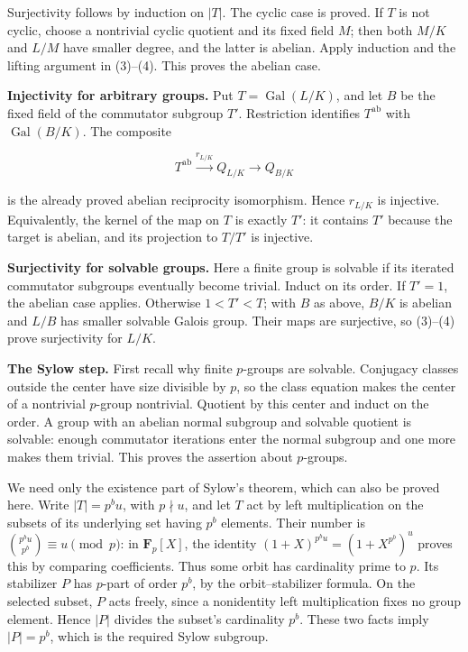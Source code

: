 \documentclass[11pt,a4paper]{article}
\begin{document}
Surjectivity follows by induction on \(|T|\). The cyclic case is proved.
If \(T\) is not cyclic, choose a nontrivial cyclic quotient and its
fixed field \(M\); then both \(M/K\) and \(L/M\) have smaller degree,
and the latter is abelian. Apply induction and the lifting argument in
(3)--(4). This proves the abelian case.

\textbf{Injectivity for arbitrary groups.} Put
\(T=\operatorname{Gal}(L/K)\), and let \(B\) be the fixed field of the
commutator subgroup \(T'\). Restriction identifies \(T^{\mathrm{ab}}\)
with \(\operatorname{Gal}(B/K)\). The composite

\[
T^{\mathrm{ab}}\xrightarrow{r_{L/K}}Q_{L/K}
\longrightarrow Q_{B/K}
\]

is the already proved abelian reciprocity isomorphism. Hence \(r_{L/K}\)
is injective. Equivalently, the kernel of the map on \(T\) is exactly
\(T'\): it contains \(T'\) because the target is abelian, and its
projection to \(T/T'\) is injective.

\textbf{Surjectivity for solvable groups.} Here a finite group is
solvable if its iterated commutator subgroups eventually become trivial.
Induct on its order. If \(T'=1\), the abelian case applies. Otherwise
\(1<T'<T\); with \(B\) as above, \(B/K\) is abelian and \(L/B\) has
smaller solvable Galois group. Their maps are surjective, so (3)--(4)
prove surjectivity for \(L/K\).

\textbf{The Sylow step.} First recall why finite \(p\)-groups are
solvable. Conjugacy classes outside the center have size divisible by
\(p\), so the class equation makes the center of a nontrivial
\(p\)-group nontrivial. Quotient by this center and induct on the order.
A group with an abelian normal subgroup and solvable quotient is
solvable: enough commutator iterations enter the normal subgroup and one
more makes them trivial. This proves the assertion about \(p\)-groups.

We need only the existence part of Sylow's theorem, which can also be
proved here. Write \(|T|=p^b u\), with \(p\nmid u\), and let \(T\) act
by left multiplication on the subsets of its underlying set having
\(p^b\) elements. Their number is \(\binom{p^b u}{p^b}\equiv u\pmod p\):
in \(\mathbf F_p[X]\), the identity \((1+X)^{p^b u}=(1+X^{p^b})^u\)
proves this by comparing coefficients. Thus some orbit has cardinality
prime to \(p\). Its stabilizer \(P\) has \(p\)-part of order \(p^b\), by
the orbit--stabilizer formula. On the selected subset, \(P\) acts
freely, since a nonidentity left multiplication fixes no group element.
Hence \(|P|\) divides the subset's cardinality \(p^b\). These two facts
imply \(|P|=p^b\), which is the required Sylow subgroup.
\end{document}
